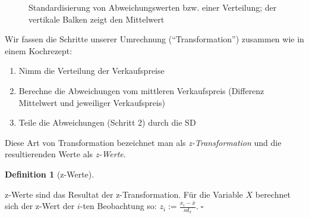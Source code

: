 \documentclass[
  letterpaper,
  oneside,
  open=any]{scrbook}
\providecommand{\tightlist}{%
  \setlength{\itemsep}{0pt}\setlength{\parskip}{0pt}}\usepackage{longtable,booktabs,array}
\theoremstyle{definition}
\theoremstyle{definition}
\theoremstyle{definition}
\newtheorem{definition}{Definition}[chapter]
\theoremstyle{remark}
\begin{document}
\begin{figure}


\caption{\label{fig-z-transf}Standardisierung von Abweichungswerten bzw.
einer Verteilung; der vertikale Balken zeigt den Mittelwert}

\end{figure}%

Wir fassen die Schritte unserer Umrechnung (\enquote{Transformation})
zusammen wie in einem Kochrezept:

\begin{enumerate}
\def\labelenumi{\arabic{enumi}.}
\tightlist
\item
  Nimm die Verteilung der Verkaufspreise
\item
  Berechne die Abweichungen vom mittleren Verkaufspreis (Differenz
  Mittelwert und jeweiliger Verkaufspreis)
\item
  Teile die Abweichungen (Schritt 2) durch die SD
\end{enumerate}

Diese Art von Transformation bezeichnet man als \emph{z-Transformation}
und die resultierenden Werte als \emph{z-Werte}.

\begin{definition}[z-Werte]\protect\hypertarget{def-z-werte}{}\label{def-z-werte}

z-Werte sind das Resultat der z-Transformation. Für die Variable \(X\)
berechnet sich der z-Wert der \(i\)-ten Beobachtung so:
\(z_i := \frac{x_i - \bar{x}}{sd_x}.\;\square\)

\end{definition}
\end{document}
